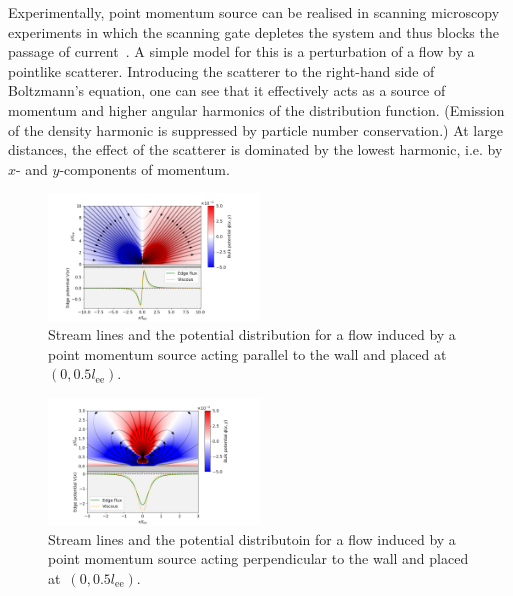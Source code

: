 \documentclass[preprint,aps,eqsecnum, prb]{revtex4-1}
\begin{document}
Experimentally, point momentum source can be realised in scanning microscopy
experiments in which the scanning gate depletes the system and thus blocks
the passage of current~\cite{bib:Ensslin}. A simple model for this is a
perturbation of a flow by a pointlike scatterer. Introducing the scatterer
to the right-hand side of Boltzmann's equation, one can see that it effectively
acts as a source of momentum and higher angular harmonics of the distribution
function. (Emission of the density harmonic is suppressed by particle number
conservation.) At large distances, the effect of the scatterer is dominated by the lowest harmonic, i.e. by $x$- and $y$-components of momentum.

\begin{figure}
  \def\svgwidth{0.5\textwidth}
  \includegraphics[width=0.5\textwidth, trim= 0in 0in 0in 0in]{combined-cos-h=0.5.png}
  \caption{
    \label{fig:cos-stream}
    \label{fig:cos-rho}
    Stream lines and the potential distribution
    for a flow induced by a point momentum source
    acting parallel to the wall and placed at~$(0, 0.5l_\mathrm{ee})$.
  }
\end{figure}
\begin{figure}
  \def\svgwidth{0.5\textwidth}
  \includegraphics[width=0.5\textwidth, trim= 0in 0in 0in 0in]{combined-sin-h=0.5.png}
  \caption{
    \label{fig:sin-stream}
    \label{fig:sin-rho}
    Stream lines and the potential distributoin
    for a flow induced by a point momentum source
    acting perpendicular to the wall and placed at~$(0, 0.5l_\mathrm{ee})$.
  }
\end{figure}
\end{document}
